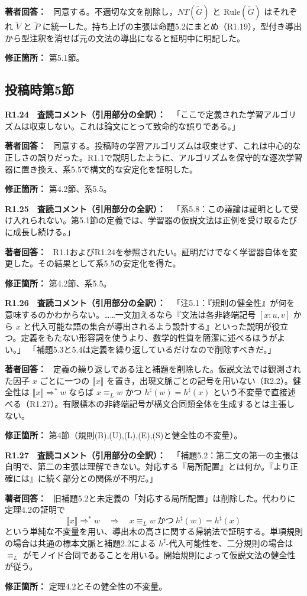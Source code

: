 \documentclass[10pt,a4paper]{ltjsarticle}
\newcommand{\NT}[1]{\llbracket #1\rrbracket}
\newcommand{\Comment}[1]{\par\medskip\noindent\textbf{#1　査読コメント（引用部分の全訳）：}\ }
\newcommand{\Reply}{\par\noindent\textbf{著者回答：}\ }
\newcommand{\Location}[1]{\par\noindent\textbf{修正箇所：} #1\par}
\begin{document}
\Reply
同意する。不適切な文を削除し，$NT(\widetilde G)$ と $\mathrm{Rule}(\widetilde G)$ はそれぞれ $\widetilde V$ と $\widetilde P$ に統一した。持ち上げの主張は命題5.2にまとめ（R1.19），型付き導出から型注釈を消せば元の文法の導出になると証明中に明記した。
\Location{第5.1節。}

\subsection*{投稿時第5節}
\Comment{R1.24}
「ここで定義された学習アルゴリズムは収束しない。これは論文にとって致命的な誤りである。」

\Reply
同意する。投稿時の学習アルゴリズムは収束せず、これは中心的な正しさの誤りだった。R1.1で説明したように、アルゴリズムを保守的な逐次学習器に置き換え、系5.5で構文的な安定化を証明した。
\Location{第4.2節、系5.5。}

\Comment{R1.25}
「系5.8：この議論は証明として受け入れられない。第5.1節の定義では、学習器の仮説文法は正例を受け取るたびに成長し続ける。」

\Reply
R1.1およびR1.24を参照されたい。証明だけでなく学習器自体を変更した。その結果として系5.5の安定化を得た。
\Location{第4.2節、系5.5。}

\Comment{R1.26}
「注5.1：『規則の健全性』が何を意味するのかわからない。……一文加えるなら『文法は各非終端記号 $[x:u,v]$ から $x$ と代入可能な語の集合が導出されるよう設計する』といった説明が役立つ。定義をもたない形容詞を使うより、数学的性質を簡潔に述べるほうがよい。」
「補題5.3と5.4は定義を繰り返しているだけなので削除すべきだ。」

\Reply
定義の繰り返しである注と補題を削除した。仮説文法では観測された因子 $x$ ごとに一つの $\NT{x}$ を置き，出現文脈ごとの記号を用いない（R2.2）。健全性は $\NT{x}\Rightarrow^*w$ ならば $x\equiv_Lw$ かつ $h^\sharp(w)=h^\sharp(x)$ という不変量で直接述べる（R1.27）。有限標本の非終端記号が構文合同類全体を生成するとは主張しない。
\Location{第4節（規則(B),(U),(L),(E),(S)と健全性の不変量）。}

\Comment{R1.27}
「補題5.2：第二文の第一の主張は自明で、第二の主張は理解できない。対応する『局所配置』とは何か。『より正確には』に続く部分との関係が不明だ。」

\Reply
旧補題5.2と未定義の「対応する局所配置」は削除した。代わりに定理4.2の証明で
\[
\NT{x}\Rightarrow^*w\quad\Longrightarrow\quad x\equiv_Lw\ \text{かつ}\ h^\sharp(w)=h^\sharp(x)
\]
という単純な不変量を用い、導出木の高さに関する帰納法で証明する。単項規則の場合は共通の標本文脈と補題2.2による $h^\sharp$-代入可能性を、二分規則の場合は $\equiv_L$ がモノイド合同であることを用いる。開始規則によって仮説文法の健全性が従う。
\Location{定理4.2とその健全性の不変量。}
\end{document}
